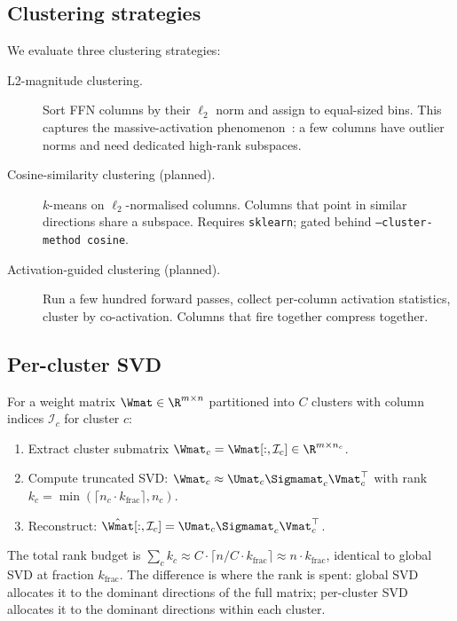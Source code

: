 \documentclass[11pt]{article}
\begin{document}
\subsection{Clustering strategies}

We evaluate three clustering strategies:

\begin{description}
\item[L2-magnitude clustering.]  Sort FFN columns by their $\ell_2$ norm
      and assign to equal-sized bins.  This captures the massive-activation
      phenomenon~\cite{sun2024massive}: a few columns have outlier norms
      and need dedicated high-rank subspaces.

\item[Cosine-similarity clustering (planned).]  $k$-means on $\ell_2$-normalised
      columns.  Columns that point in similar directions share a subspace.
      Requires \texttt{sklearn}; gated behind \texttt{--cluster-method cosine}.

\item[Activation-guided clustering (planned).]  Run a few hundred forward
      passes, collect per-column activation statistics, cluster by
      co-activation.  Columns that fire together compress together.
\end{description}

\subsection{Per-cluster SVD}

For a weight matrix $\Wmat\in\R^{m\times n}$ partitioned into $C$ clusters
with column indices $\mathcal{I}_c$ for cluster $c$:

\begin{enumerate}
\item Extract cluster submatrix $\Wmat_c = \Wmat[:,\mathcal{I}_c]\in\R^{m\times n_c}$.
\item Compute truncated SVD: $\Wmat_c \approx \Umat_c\Sigmamat_c\Vmat_c^\top$
      with rank $k_c = \min(\lceil n_c\cdot k_\text{frac}\rceil, n_c)$.
\item Reconstruct: $\hat\Wmat[:,\mathcal{I}_c] = \Umat_c\Sigmamat_c\Vmat_c^\top$.
\end{enumerate}

The total rank budget is $\sum_c k_c \approx C\cdot \lceil n/C \cdot k_\text{frac}\rceil
\approx n\cdot k_\text{frac}$, identical to global SVD at fraction $k_\text{frac}$.
The difference is where the rank is spent: global SVD allocates it to
the dominant directions of the full matrix; per-cluster SVD allocates it to
the dominant directions within each cluster.
\end{document}
